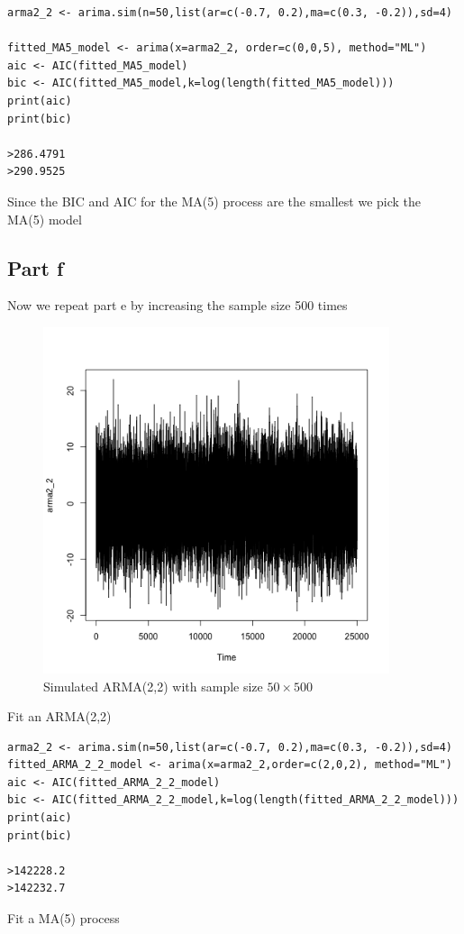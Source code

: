 \documentclass[11pt, oneside]{article}   	%
\begin{document}
\begin{lstlisting}
arma2_2 <- arima.sim(n=50,list(ar=c(-0.7, 0.2),ma=c(0.3, -0.2)),sd=4)

fitted_MA5_model <- arima(x=arma2_2, order=c(0,0,5), method="ML")
aic <- AIC(fitted_MA5_model)
bic <- AIC(fitted_MA5_model,k=log(length(fitted_MA5_model)))
print(aic)
print(bic)

>286.4791
>290.9525
\end{lstlisting}
Since the BIC and AIC for the MA(5) process are the smallest we pick the MA(5) model
\subsection{Part f}
Now we repeat part e by increasing the sample size 500 times
\begin{figure}[H] %
   \centering
   \includegraphics[width=4in]{simulated-arma2_2_plus} 
   \caption{Simulated ARMA(2,2) with sample size $50\times 500$}
   \label{fig:example}
\end{figure}
\justify
Fit an ARMA(2,2)
\begin{lstlisting}
arma2_2 <- arima.sim(n=50,list(ar=c(-0.7, 0.2),ma=c(0.3, -0.2)),sd=4)
fitted_ARMA_2_2_model <- arima(x=arma2_2,order=c(2,0,2), method="ML")
aic <- AIC(fitted_ARMA_2_2_model)
bic <- AIC(fitted_ARMA_2_2_model,k=log(length(fitted_ARMA_2_2_model)))
print(aic)
print(bic)

>142228.2
>142232.7
\end{lstlisting}
\justify
Fit a MA(5) process 
\end{document}
